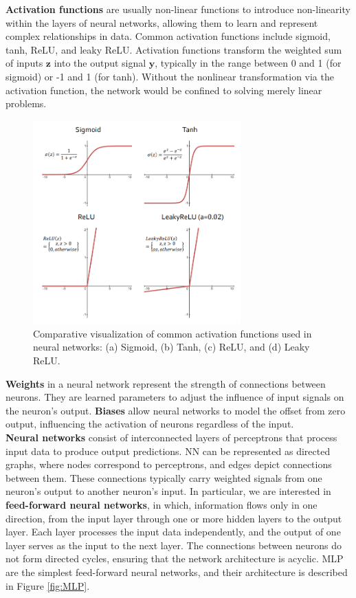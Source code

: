 \textbf{Activation functions} are usually non-linear functions to introduce non-linearity within the layers of neural networks, allowing them to learn and represent complex relationships in data. Common activation functions include sigmoid, tanh, \gls{ReLU}, and leaky ReLU. Activation functions transform the weighted sum of inputs $\mathbf{z}$ into the output signal $\mathbf{y}$, typically in the range between 0 and 1 (for sigmoid) or -1 and 1 (for tanh). Without the nonlinear transformation via the activation function, the network would be confined to solving merely linear problems. \\
\begin{figure}[ht]
    \centering
    \includegraphics[width=8cm]{images/Theory-DL/ActGraphs.png}
    \caption{Comparative visualization of common activation functions used in neural networks: (a) Sigmoid, (b) Tanh, (c) ReLU, and (d) Leaky ReLU.}
    \label{fig:ActGraphs}
  \end{figure}
\textbf{Weights} in a neural network represent the strength of connections between neurons. They are learned parameters to adjust the influence of input signals on the neuron's output. \textbf{Biases} allow neural networks to model the offset from zero output, influencing the activation of neurons regardless of the input.\\
\textbf{Neural networks} consist of interconnected layers of perceptrons that process input data to produce output predictions. \gls{NN} can be represented as directed graphs, where nodes correspond to perceptrons, and edges depict connections between them. These connections typically carry weighted signals from one neuron's output to another neuron's input. In particular, we are interested in \textbf{feed-forward neural networks}, in which, information flows only in one direction, from the input layer through one or more hidden layers to the output layer. Each layer processes the input data independently, and the output of one layer serves as the input to the next layer. The connections between neurons do not form directed cycles, ensuring that the network architecture is acyclic. \gls{MLP} are the simplest feed-forward neural networks, and their architecture is described in Figure \ref{fig:MLP}. 
